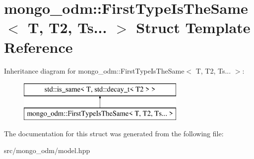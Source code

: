 \hypertarget{structmongo__odm_1_1FirstTypeIsTheSame_3_01T_00_01T2_00_01Ts_8_8_8_01_4}{}\section{mongo\+\_\+odm\+:\+:First\+Type\+Is\+The\+Same$<$ T, T2, Ts... $>$ Struct Template Reference}
\label{structmongo__odm_1_1FirstTypeIsTheSame_3_01T_00_01T2_00_01Ts_8_8_8_01_4}
Inheritance diagram for mongo\+\_\+odm\+:\+:First\+Type\+Is\+The\+Same$<$ T, T2, Ts... $>$\+:\begin{figure}[H]
\begin{center}
\leavevmode
\includegraphics[height=2.000000cm]{structmongo__odm_1_1FirstTypeIsTheSame_3_01T_00_01T2_00_01Ts_8_8_8_01_4}
\end{center}
\end{figure}


The documentation for this struct was generated from the following file\+:\begin{DoxyCompactItemize}
\item 
src/mongo\+\_\+odm/model.\+hpp\end{DoxyCompactItemize}

